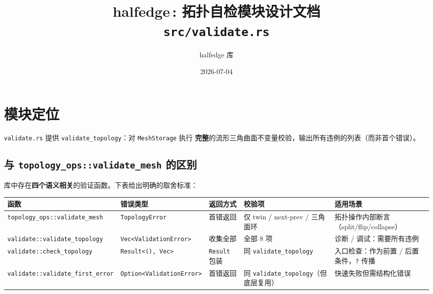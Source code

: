 \documentclass[11pt,a4paper]{article}
\title{\textbf{halfedge\,: 拓扑自检模块设计文档} \\ \large \texttt{src/validate.rs}}
\author{halfedge 库}
\date{2026-07-04}
\begin{document}
\maketitle
\tableofcontents

\section{模块定位}

\texttt{validate.rs} 提供 \texttt{validate\_topology}：对 \texttt{MeshStorage} 执行
\textbf{完整}的流形三角曲面不变量校验，输出所有违例的列表（而非首个错误）。

\subsection{与 \texttt{topology\_ops::validate\_mesh} 的区别}

库中存在\textbf{四个语义相关}的验证函数。下表给出明确的取舍标准：

\begin{center}
\renewcommand{\arraystretch}{1.20}
\begin{tabular}{@{}lllll@{}}
  \toprule
  \textbf{函数} & \textbf{错误类型} & \textbf{返回方式} & \textbf{校验项} & \textbf{适用场景} \\
  \midrule
  \texttt{topology\_ops::validate\_mesh}
    & \texttt{TopologyError}
    & 首错返回
    & 仅 twin / next-prev / 三角面环
    & 拓扑操作内部断言（split/flip/collapse） \\
  \texttt{validate::validate\_topology}
    & \texttt{Vec<ValidationError>}
    & 收集全部
    & 全部 8 项
    & 诊断 / 调试：需要所有违例 \\
  \texttt{validate::check\_topology}
    & \texttt{Result<(), Vec>}
    & \texttt{Result} 包装
    & 同 \texttt{validate\_topology}
    & 入口检查：作为前置 / 后置条件，\texttt{?} 传播 \\
  \texttt{validate::validate\_first\_error}
    & \texttt{Option<ValidationError>}
    & 首错返回
    & 同 \texttt{validate\_topology}（但底层复用）
    & 快速失败但需结构化错误 \\
  \bottomrule
\end{tabular}
\end{center}
\end{document}
